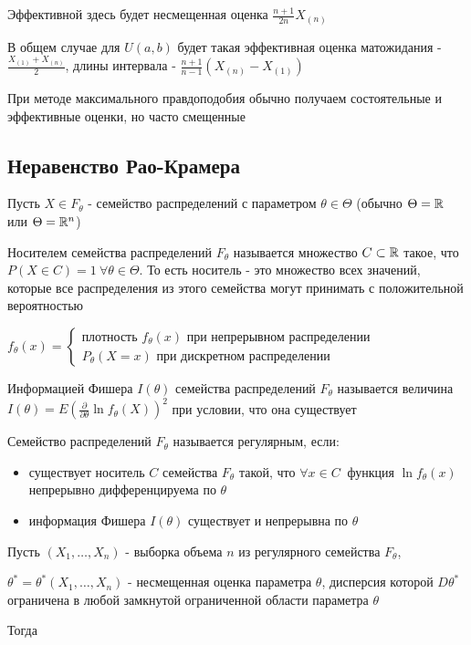 \documentclass[12pt]{article}
\begin{document}
\Nota Эффективной здесь будет несмещенная оценка $\frac{n + 1}{2n} X_{(n)}$

В общем случае для $U(a, b)$ будет такая эффективная оценка матожидания - $\frac{X_{(1)} + X_{(n)}}{2}$, длины интервала - $\frac{n + 1}{n - 1} (X_{(n)} - X_{(1)})$

\Nota При методе максимального правдоподобия обычно получаем состоятельные и эффективные оценки, но часто смещенные

\subsection{Неравенство Рао-Крамера}

Пусть $X \in F_\theta$ - семейство распределений с параметром $\theta \in \Theta$ (обычно $\Theta = \mathbb{R}$ или $\Theta = \mathbb{R}^n$)

\Def Носителем семейства распределений $F_\theta$ называется множество $C \subset \mathbb{R}$
такое, что $P(X \in C) = 1 \ \forall \theta \in \Theta$. То есть носитель - это множество всех значений, которые все распределения из этого семейства могут принимать с положительной вероятностью

$f_\theta(x) = \begin{cases}
    \text{плотность } f_\theta(x) \text{ при непрерывном распределении} \\
    P_\theta(X = x) \text{ при дискретном распределении}
\end{cases}$

\hypertarget{fishers_information}{}

\Def Информацией Фишера $I(\theta)$ семейства распределений $F_\theta$ называется величина 
$I(\theta) = E\left(\frac{\partial}{\partial \theta} \ln f_\theta(X)\right)^2$ при условии, что
она существует

\Def Семейство распределений $F_\theta$ называется регулярным, если:

\begin{itemize}
    \item существует носитель $C$ семейства $F_\theta$ такой, что $\forall x \in C \ $ функция $\ln f_\theta(x)$ непрерывно дифференцируема по $\theta$
    \item информация Фишера $I(\theta)$ существует и непрерывна по $\theta$
\end{itemize}

\hypertarget{rao_kramer_inequality}{}

\begin{MyTheorem}
    \Ths Пусть $(X_1, \dots, X_n)$ - выборка объема $n$ из регулярного семейства $F_\theta$,

    $\theta^* = \theta^*(X_1, \dots, X_n)$ - несмещенная оценка параметра $\theta$, дисперсия которой
    $D\theta^*$ ограничена в любой замкнутой ограниченной области параметра $\theta$

    Тогда 
\end{MyTheorem}
\end{document}
